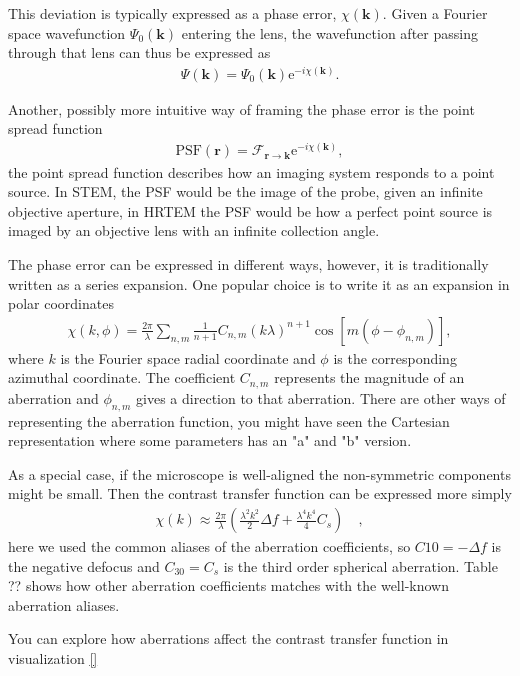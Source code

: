 \documentclass[%
 superscriptaddress,
 aip,
 amsmath,amssymb,
preprint,%
 author-year,%
longbibliography
]{revtex4-2}
\newcommand{\FFT}{\mathcal{F}_{\mathbf{r}\to\mathbf{k}}}
\begin{document}
This deviation is typically expressed as a phase error, $\chi(\bm{k})$. Given a Fourier space wavefunction $\Psi_0(\bm{k})$ entering the lens, the wavefunction after passing through that lens can thus be expressed as 
\begin{align*}
    \Psi(\bm{k}) = \Psi_0(\bm{k}) \mathrm{e} ^ {-i \chi(\bm{k})}.
\end{align*}

Another, possibly more intuitive way of framing the phase error is the point spread function 
\begin{align*}
    \mathrm{PSF}(\bm{r}) = \FFT \mathrm{e} ^ {-i \chi(\bm{k})} ,
\end{align*}
the point spread function describes how an imaging system responds to a point source. In STEM, the PSF would be the image of the probe, given an infinite objective aperture, in HRTEM the PSF would be how a perfect point source is imaged by an objective lens with an infinite collection angle.  

The phase error can be expressed in different ways, however, it is traditionally written as a series expansion. One popular choice is to write it as an expansion in polar coordinates
\begin{align*}
    \chi(k, \phi) = \frac{2 \pi}{\lambda} \sum_{n,m} \frac{1}{n + 1} C_{n,m} (k \lambda)^{n+1} \cos\left[m (\phi - \phi_{n,m}) \right] ,
\end{align*}
where $k$ is the Fourier space radial coordinate and $\phi$ is the corresponding azimuthal coordinate. The coefficient $C_{n,m}$ represents the magnitude of an aberration and $\phi_{n,m}$ gives a direction to that aberration. There are other ways of representing the aberration function, you might have seen the Cartesian representation where some parameters has an "a" and "b" version.

As a special case, if the microscope is well-aligned the non-symmetric components might be small. Then the contrast transfer function can be expressed more simply
\begin{align*}
    \chi(k) \approx \frac{2\pi}{\lambda}\left( \frac{\lambda^2 k^2}{2} \Delta f + \frac{\lambda^4 k^4}{4} C_s \right) \quad ,
\end{align*}
here we used the common aliases of the aberration coefficients, so $C10 = -\Delta f$ is the negative defocus and $C_{30} = C_s$ is the third order spherical aberration. Table ?? shows how other aberration coefficients matches with the well-known aberration aliases.  

You can explore how aberrations affect the contrast transfer function in visualization \ref{}
\end{document}

